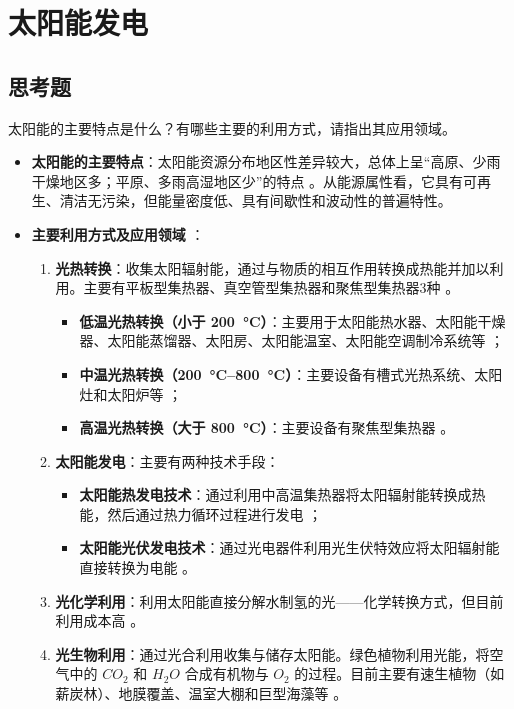\chapter{太阳能发电}

\section{思考题}

\begin{problem}\label{exer:think_04_solar_01}
太阳能的主要特点是什么？有哪些主要的利用方式，请指出其应用领域。
\end{problem}

\begin{solution}
\begin{itemize}
\item \textbf{太阳能的主要特点}：太阳能资源分布地区性差异较大，总体上呈“高原、少雨干燥地区多；平原、多雨高湿地区少”的特点 。从能源属性看，它具有可再生、清洁无污染，但能量密度低、具有间歇性和波动性的普遍特性。
\item \textbf{主要利用方式及应用领域} ：
\begin{enumerate}
\item \textbf{光热转换}：收集太阳辐射能，通过与物质的相互作用转换成热能并加以利用。主要有平板型集热器、真空管型集热器和聚焦型集热器3种 。
\begin{itemize}
\item \textbf{低温光热转换（小于 \qty{200}{\degreeCelsius}）}：主要用于太阳能热水器、太阳能干燥器、太阳能蒸馏器、太阳房、太阳能温室、太阳能空调制冷系统等 ；
\item \textbf{中温光热转换（\qtyrange{200}{800}{\degreeCelsius}）}：主要设备有槽式光热系统、太阳灶和太阳炉等 ；
\item \textbf{高温光热转换（大于 \qty{800}{\degreeCelsius}）}：主要设备有聚焦型集热器 。
\end{itemize}
\item \textbf{太阳能发电}：主要有两种技术手段：
\begin{itemize}
\item \textbf{太阳能热发电技术}：通过利用中高温集热器将太阳辐射能转换成热能，然后通过热力循环过程进行发电 ；
\item \textbf{太阳能光伏发电技术}：通过光电器件利用光生伏特效应将太阳辐射能直接转换为电能 。
\end{itemize}
\item \textbf{光化学利用}：利用太阳能直接分解水制氢的光——化学转换方式，但目前利用成本高 。
\item \textbf{光生物利用}：通过光合利用收集与储存太阳能。绿色植物利用光能，将空气中的 \(CO_2\) 和 \(H_2O\) 合成有机物与 \(O_2\) 的过程。目前主要有速生植物（如薪炭林）、地膜覆盖、温室大棚和巨型海藻等 。
\end{enumerate}
\end{itemize}
\end{solution}


